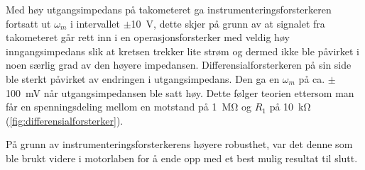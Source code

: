 Med høy utgangsimpedans på takometeret ga instrumenteringsforsterkeren fortsatt ut $\omega_m$ i intervallet $\pm${\SI{10}{\volt}}, dette skjer på grunn av at signalet fra takometeret går rett inn i en operasjonsforsterker med veldig høy inngangsimpedans slik at kretsen trekker lite strøm og dermed ikke ble påvirket i noen særlig grad av den høyere impedansen. 
Differensialforsterkeren på sin side ble sterkt påvirket av endringen i utgangsimpedans. Den ga en $\omega_m$ på ca. $\pm${\SI{100}{\milli\volt}} når utgangsimpedansen ble satt høy. Dette følger teorien ettersom man får en spenningsdeling mellom en motstand på {\SI{1}{\mega\ohm}} og $R_1$ på {\SI{10}{\kilo\ohm}} (\autoref{fig:differensialforsterker}).

På grunn av instrumenteringsforsterkerens høyere robusthet, var det denne som ble brukt videre i motorlaben for å ende opp med et best mulig resultat til slutt.

